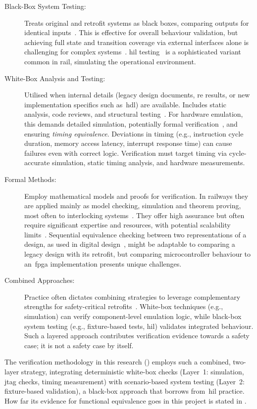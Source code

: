 \begin{description}
	\item[Black-Box System Testing:] Treats original and retrofit systems as black boxes, comparing outputs for identical inputs~\cite{ammann2016introduction}. This is effective for overall behaviour validation, but achieving full state and transition coverage via external interfaces alone is challenging for complex systems~\cite{hierons2009using}. \gls{hil} testing~\cite{hil_rail_suspension_2023, zhou_wu_2020} is a sophisticated variant common in rail, simulating the operational environment.
	\item[White-Box Analysis and Testing:] Utilised when internal details (legacy design documents, \gls{re} results, or new implementation specifics such as~\gls{hdl}) are available. Includes static analysis, code reviews, and structural testing~\cite{ammann2016introduction}. For hardware emulation, this demands detailed simulation, potentially formal verification~\cite{bozzano2016formal}, and ensuring \textit{timing equivalence}. Deviations in timing (e.g., instruction cycle duration, memory access latency, interrupt response time) can cause failures even with correct logic. Verification must target timing via cycle-accurate simulation, static timing analysis, and hardware measurements.
	\item[Formal Methods:] Employ mathematical models and proofs for verification. In railways they are applied mainly as model checking, simulation and theorem proving, most often to interlocking systems~\cite{formal_verification_rail_2023}. They offer high assurance but often require significant expertise and resources, with potential scalability limits~\cite{bozzano2016formal}. Sequential equivalence checking between two representations of a design, as used in digital design~\cite{mneimneh2005sequential}, might be adaptable to comparing a legacy design with its retrofit, but comparing microcontroller behaviour to an~\gls{fpga} implementation presents unique challenges.
	\item[Combined Approaches:] Practice often dictates combining strategies to leverage complementary strengths for safety-critical retrofits~\cite{ammann2016introduction}. White-box techniques (e.g., simulation) can verify component-level emulation logic, while black-box system testing (e.g., fixture-based tests, \gls{hil}) validates integrated behaviour. Such a layered approach contributes verification evidence towards a safety case; it is not a safety case by itself.
\end{description}
The verification methodology in this research () employs such a combined, two-layer strategy, integrating deterministic white-box checks (Layer~1: simulation, \gls{jtag} checks, timing measurement) with scenario-based system testing (Layer~2: fixture-based validation), a black-box approach that borrows from~\gls{hil} practice. How far its evidence for functional equivalence goes in this project is stated in .

